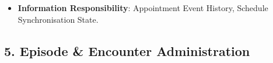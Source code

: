 \begin{itemize}
\begin{itemize}
\begin{itemize}

\item 
\emph{Function}: \texttt{} — Projects synchronised appointment timelines to clinical dashboards and care coordinators.



\item 
\emph{Exposed Service}: \texttt{} — Exposes consolidated patient appointment schedules across facilities.



\end{itemize}


\end{itemize}


\item 
\textbf{Information Responsibility}: Appointment Event History, Schedule Synchronisation State.



\end{itemize}
\label{rad:sa:60}

\par\smallskip
{}\label{rad:sa:62}
\subsection*{5. Episode \& Encounter Administration}
\label{rad:sa:63}

